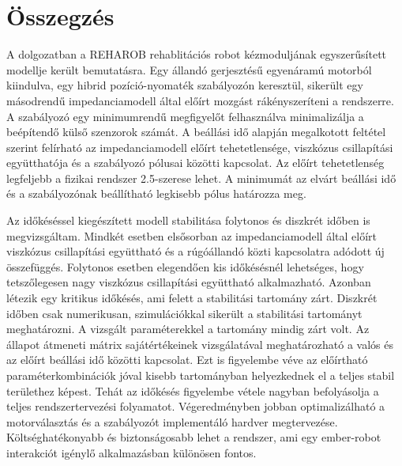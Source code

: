 \chapter{Összegzés}\label{chap:summary}

A dolgozatban a REHAROB rehablitációs robot kézmoduljának egyszerűsített modellje került bemutatásra. Egy állandó 
gerjesztésű egyenáramú motorból kiindulva, egy hibrid pozíció-nyomaték szabályozón keresztül, sikerült egy másodrendű 
impedanciamodell által előírt mozgást rákényszeríteni a rendszerre. A szabályozó egy minimumrendű megfigyelőt 
felhasználva minimalizálja a beépítendő külső szenzorok számát. A beállási idő alapján megalkotott feltétel 
szerint felírható az impedanciamodell előírt tehetetlensége, viszkózus csillapítási együtthatója és a szabályozó 
pólusai közötti kapcsolat. Az előírt tehetetlenség legfeljebb a fizikai rendszer 2.5-szerese lehet. A minimumát az 
elvárt beállási idő és a szabályozónak beállítható legkisebb pólus határozza meg. 

Az időkéséssel kiegészített modell stabilitása folytonos és diszkrét időben is megvizsgáltam. Mindkét 
esetben elsősorban az impedanciamodell által előírt viszkózus csillapítási együttható és a rúgóállandó közti 
kapcsolatra adódott új összefüggés. Folytonos esetben elegendően kis időkésésnél lehetséges, hogy tetszőlegesen 
nagy viszkózus csillapítási együttható alkalmazható. Azonban létezik egy kritikus időkésés, ami felett 
a stabilitási tartomány zárt. Diszkrét időben csak numerikusan, szimulációkkal sikerült a stabilitási tartományt
meghatározni. A vizsgált paraméterekkel a tartomány mindig zárt volt. Az állapot átmeneti mátrix sajátértékeinek
vizsgálatával meghatározható a valós és az előírt beállási idő közötti kapcsolat. Ezt is figyelembe véve az 
előírtható paraméterkombinációk jóval kisebb tartományban helyezkednek el a teljes stabil területhez képest. Tehát 
az időkésés figyelembe vétele nagyban befolyásolja a teljes rendszertervezési folyamatot. Végeredményben jobban 
optimalizálható a motorválasztás és a szabályozót implementáló hardver megtervezése. Költséghatékonyabb és biztonságosabb 
lehet a rendszer, ami egy ember-robot interakciót igénylő alkalmazásban különösen fontos. 

